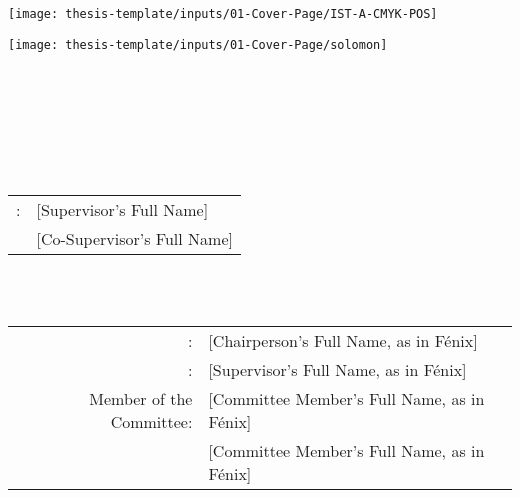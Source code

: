 

\thispagestyle{empty}

\texttt{[image: thesis-template/inputs/01-Cover-Page/IST-A-CMYK-POS]}

\begin{center}


\vspace{.05\textheight}
\begin{center}
\texttt{[image: thesis-template/inputs/01-Cover-Page/solomon]}
\end{center}
\vspace{.025\textheight}



\vspace{1.0cm}
{} \\ 
\vspace{0.2cm}
{} \\
\vspace{0.9cm}

\vspace{0.6cm}
{} \\ 

\vspace{2.0cm}
{\FontSn \coverThesis} \\
\vspace{0.3cm}
{}  \\

\vspace{1.0cm}
{\FontSn %
\begin{tabular}{ll}
	\coverSupervisors: & [Supervisor's Full Name] \\
	                   & [Co-Supervisor's Full Name]
\end{tabular} } \\

\vspace{1.0cm}
{\FontMb \coverExaminationCommittee} \\
\vspace{0.3cm}
{\FontSn %
\begin{tabular}{rl}
	  \coverChairperson:    & [Chairperson's Full Name, as in Fénix]  \\
	  \coverSupervisor:     & [Supervisor's Full Name, as in Fénix]   \\
	Member of the Committee:	& [Committee Member's Full Name, as in Fénix] \\
								& [Committee Member's Full Name, as in Fénix]
\end{tabular} } \\

\vspace{1.5cm}
{} \\ 


\end{center}
